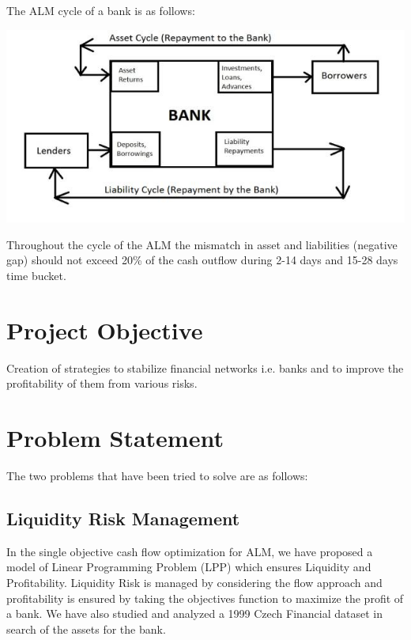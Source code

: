 		The ALM cycle of a bank is as follows:

		\begin{center}
		\includegraphics[width=\linewidth]{figures/ALM_Cycle_of_a_Bank.jpg}	
		\label{fig:ALM Cycle of a Bank}
		\end{center}

		Throughout the cycle of the ALM the mismatch in asset and liabilities (negative gap) should not exceed 20\% of the cash outflow during 2-14 days and 15-28 days time bucket.

	
\section{Project Objective}

	Creation of strategies to stabilize financial networks i.e. banks and to improve the profitability of them from various risks. 

\section{Problem Statement}

	The two problems that have been tried to solve are as follows:
	\subsection{Liquidity Risk Management}

		In the single objective cash flow optimization for ALM, we have proposed a model of Linear Programming Problem (LPP) which ensures Liquidity and Profitability. Liquidity Risk is managed by considering the flow approach and profitability is ensured by taking the objectives function to maximize the profit of a bank.
		We have also studied and analyzed a 1999 Czech Financial dataset in search of the assets for the bank.

